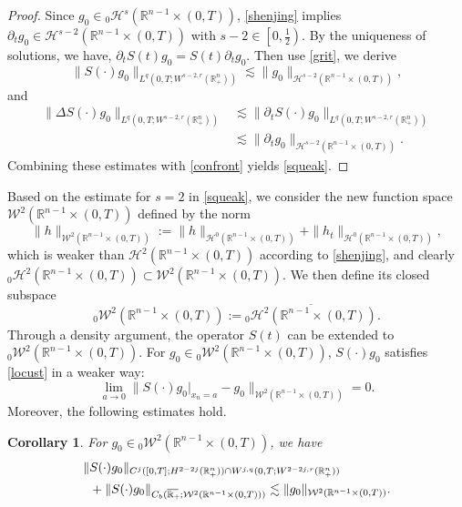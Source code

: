 \documentclass[preprint,compress,12pt]{elsarticle}
\newtheorem{corollary}[theorem]{Corollary}
\numberwithin{equation}{section}
\begin{document}
\begin{proof}
	Since $g_{0}\in{}_{0}\mathcal{H}^{s}(\mathbb{R}^{n-1}\times(0,T))$, \eqref{shenjing} implies  $\partial_{t}g_{0}\in \mathcal{H}^{s-2}(\mathbb{R}^{n-1}\times(0,T))$ with $s-2\in\left[0,\frac{1}{2}\right)$. By the uniqueness of solutions, we have, $\partial_{t}S(t)g_{0}=S(t)\partial_{t}g_{0}$. Then use \eqref{grit}, we derive
	\begin{equation*}
		\|S(\cdot)g_{0}\|_{L^{q}(0,T;W^{s-2,r}(\mathbb{R}^{n}_{+}))}\lesssim  \|g_{0}\|_{\mathcal{H}^{s-2}(\mathbb{R}^{n-1}\times(0,T))},
	\end{equation*}
	and
	\begin{equation*}
		\begin{aligned}
		\|\Delta S(\cdot)g_{0}\|_{L^{q}(0,T;W^{s-2,r}(\mathbb{R}^{n}_{+}))}&\lesssim\|\partial_{t}S(\cdot)g_{0}\|_{L^{q}(0,T;W^{s-2,r}(\mathbb{R}^{n}_{+}))}\\
		&\lesssim  \|\partial_{t}g_{0}\|_{\mathcal{H}^{s-2}(\mathbb{R}^{n-1}\times(0,T))}.
		\end{aligned}
	\end{equation*}
	Combining these estimates with \eqref{confront} yields \eqref{squeak}.
\end{proof}

Based on the estimate for $s=2$ in \eqref{squeak}, we consider the new function space $\mathcal{W}^{2}(\mathbb{R}^{n-1}\times(0,T))$ defined by the norm
\begin{equation}\label{huaw}
	\|h\|_{\mathcal{W}^{2}(\mathbb{R}^{n-1}\times(0,T))}:=\|h\|_{\mathcal{H}^{0}(\mathbb{R}^{n-1}\times(0,T))}+\|h_{t}\|_{\mathcal{H}^{0}(\mathbb{R}^{n-1}\times(0,T))},
\end{equation}
which is weaker than $\mathcal{H}^{2}(\mathbb{R}^{n-1}\times(0,T))$ according to \eqref{shenjing}, and clearly ${}_{0}\mathcal{H}^{2}(\mathbb{R}^{n-1}\times(0,T))\subset \mathcal{W}^{2}(\mathbb{R}^{n-1}\times(0,T))$. We then define its closed subspace \[{}_{0}\mathcal{W}^{2}(\mathbb{R}^{n-1}\times(0,T)):=\overline{{}_{0}\mathcal{H}^{2}(\mathbb{R}^{n-1}\times(0,T))}.\] Through a density argument, the operator $S(t)$ can be extended to ${}_{0}\mathcal{W}^{2}(\mathbb{R}^{n-1}\times(0,T))$. For $g_{0}\in {}_{0}\mathcal{W}^{2}(\mathbb{R}^{n-1}\times(0,T))$, $S(\cdot)g_{0}$ satisfies \eqref{locust}  in a weaker way: \[\lim\limits_{a\rightarrow0}\big\|S(\cdot)g_{0}|_{x_{n}=a}-g_{0}\big\|_{\mathcal{W}^{2}(\mathbb{R}^{n-1}\times(0,T))}=0. \]
Moreover, the following estimates hold.
\begin{corollary}
	For $g_{0}\in{}_{0}\mathcal{W}^{2}(\mathbb{R}^{n-1}\times(0,T))$, we have
	{\small	\begin{equation}\label{invoice}
			\begin{aligned} \|&S(\cdot)g_{0}\|_{C^{j}([0,T];H^{2-2j}(\mathbb{R}^{n}_{+}))\cap W^{j,q}(0,T;W^{2-2j,r}(\mathbb{R}^{n}_{+}))}\\&+\|S(\cdot)g_{0}\|_{C_{b}(\overline{\mathbb{R}_{+}\mkern-4mu}\,;\mathcal{W}^{2}(\mathbb{R}^{n-1}\times(0,T)))}\lesssim\|g_{0}\|_{\mathcal{W}^{2}(\mathbb{R}^{n-1}\times(0,T))}.
			\end{aligned}
	\end{equation}}
\end{corollary}
\end{document}
